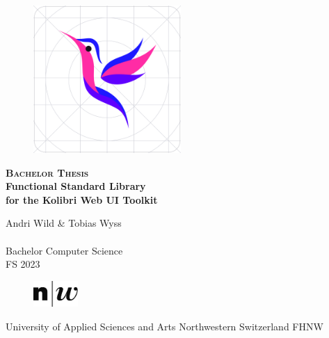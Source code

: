 






\begin{titlepage}
\begin{center}

    \begin{figure}[H]
        \centering
        \includegraphics[width=0.50\textwidth]{./frontmatter/pictures/kolibri-logo}
    \end{figure}
    \vspace*{1cm}
    {
      \huge \textsc \bfseries Bachelor Thesis
    }
    \vspace*{1cm}
    {
      \Huge \bfseries \\Functional Standard Library \\for the Kolibri Web UI Toolkit  \\ 
    }
    \vspace{1.5cm}
    {\large 
      Andri Wild \& Tobias Wyss\\ ~\\
    	Bachelor Computer Science\\
    	\vspace{1.0cm}
    	FS 2023\\
    	\vspace{1.0cm}
    \begin{figure}[h]
        \centering
        \includegraphics[width=0.15\textwidth]{./frontmatter/pictures/fhnw_e_10mm.jpg}
    \end{figure}
    	University of Applied Sciences and Arts Northwestern Switzerland FHNW
        ~\\
    }


\end{center}
\end{titlepage}
